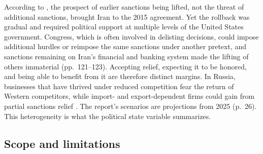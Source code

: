  According to
\citet[pp.~115--116]{BajoghliNasrSalehiIsfahaniVaez2024}, the prospect of earlier
sanctions being lifted, not the threat of additional sanctions, brought Iran to the 2015
agreement. Yet the rollback was gradual and required political support at multiple levels
of the United States government. Congress, which is often involved in delisting
decisions, could impose additional hurdles or reimpose the same sanctions under another
pretext, and sanctions remaining on Iran's financial and banking system made the lifting
of others immaterial (pp.~121--123). Accepting relief, expecting it to be honored, and
being able to benefit from it are therefore distinct margins. In Russia, businesses that
have thrived under reduced competition fear the return of Western competitors, while
import- and export-dependent firms could gain from partial sanctions relief
\citep[pp.~31--32]{SnegovayaFentonDolbaiaBergmann2025}. The report's scenarios are
projections from 2025 (p.~26). This heterogeneity is what the political state variable
summarizes.

\subsection{Scope and limitations}
\label{sec:discussion:scope}

